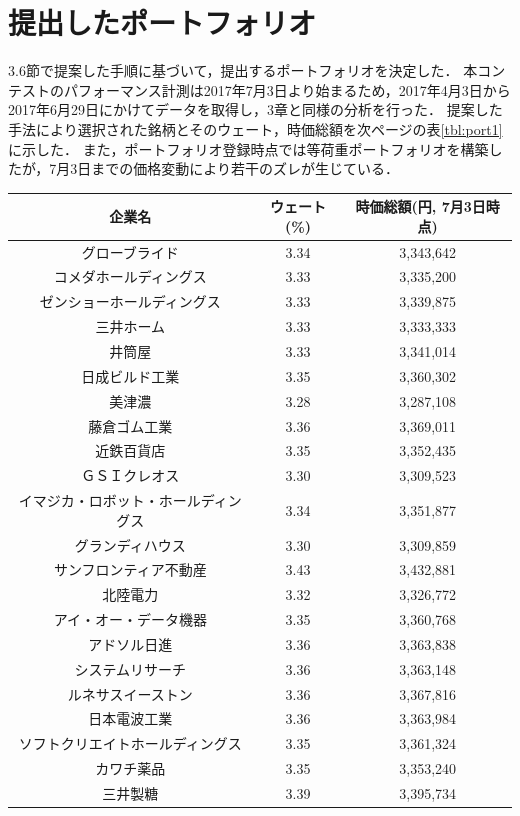 \documentclass[11pt]{jreport}
\begin{document}
\section{提出したポートフォリオ}
3.6節で提案した手順に基づいて，提出するポートフォリオを決定した．
本コンテストのパフォーマンス計測は2017年7月3日より始まるため，2017年4月3日から2017年6月29日にかけてデータを取得し，3章と同様の分析を行った．
提案した手法により選択された銘柄とそのウェート，時価総額を次ページの表\ref{tbl:port1}に示した．
また，ポートフォリオ登録時点では等荷重ポートフォリオを構築したが，7月3日までの価格変動により若干のズレが生じている．
\begin{table}[H]
\begin{center}
\begin{tabular}{|c|c|c|}
\hline
企業名 & ウェート(\%) & 時価総額(円, 7月3日時点)\\
\hline
\hline
グローブライド	&3.34&3,343,642\\
コメダホールディングス&3.33	&3,335,200\\
ゼンショーホールディングス&3.33&	3,339,875\\
三井ホーム&3.33&3,333,333\\
井筒屋&3.33	&3,341,014\\
日成ビルド工業&3.35&3,360,302\\
美津濃&3.28	&3,287,108\\
藤倉ゴム工業	&	3.36	&	3,369,011	\\
近鉄百貨店	&	3.35	&	3,352,435	\\
ＧＳＩクレオス	&	3.30	&	3,309,523	\\
イマジカ・ロボット・ホールディングス	&	3.34	&3,351,877\\
グランディハウス	&	3.30	&	3,309,859	\\
サンフロンティア不動産	&	3.43	&	3,432,881	\\
北陸電力	&	3.32	&	3,326,772	\\
アイ・オー・データ機器	&	3.35	&	3,360,768	\\
アドソル日進	&	3.36	&	3,363,838	\\
システムリサーチ	&	3.36	&	3,363,148	\\
ルネサスイーストン	&	3.36	&	3,367,816	\\
日本電波工業	&	3.36	&	3,363,984	\\
ソフトクリエイトホールディングス	&	3.35	&3,361,324\\
カワチ薬品	&	3.35	&	3,353,240	\\
三井製糖	&	3.39	&	3,395,734	\\

\end{tabular}
\end{center}
\end{table}
\end{document}
